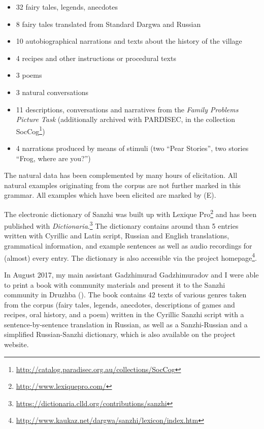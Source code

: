 \begin{itemize}
	\item 32 fairy tales, legends, anecdotes
	\item 8 fairy tales translated from Standard Dargwa and Russian
	\item 10 autobiographical narrations and texts about the history of the village
	\item 4 recipes and other instructions or procedural texts
	\item 3 poems
	\item 3 natural conversations
	\item 11 descriptions, conversations and narratives from the \textit{\textit{Family Problems Picture Task}} \citep{SanRoqueEtAl2012} (additionally archived with PARDISEC, in the collection SocCog\footnote{\url{http://catalog.paradisec.org.au/collections/SocCog}})
	\item 4 narrations produced by means of stimuli (two ``Pear Stories'', two stories ``Frog, where are you?'') 
\end{itemize}

The natural data has been complemented by many hours of elicitation. All natural examples originating from the corpus are not further marked in this grammar. All examples which have been elicited are marked by (E).


\pagebreak 

\sloppy The electronic dictionary of Sanzhi was built up with Lexique Pro\footnote{\url{http://www.lexiquepro.com/}} and has been published with \textit{Dictionaria}.\footnote{\url{https://dictionaria.clld.org/contributions/sanzhi}} The dictionary contains around than 5 entries written with Cyrillic and Latin script, Russian and English translations, grammatical information, and example sentences as well as audio recordings for (almost) every entry. The dictionary is also accessible via the project homepage\footnote{\url{http://www.kaukaz.net/dargwa/sanzhi/lexicon/index.htm}}.

In August 2017, my main assistant Gadzhimurad Gadzhimuradov and I were able to print a book with community materials and present it to the Sanzhi community in Druzhba (). The book contains 42 texts of various genres taken from the corpus (fairy tales, legends, anecdotes, descriptions of games and recipes, oral history, and a poem) written in the Cyrillic Sanzhi script with a sentence-by-sentence translation in Russian, as well as a Sanzhi-Russian and a simplified Russian-Sanzhi dictionary, which is also available on the project website.

